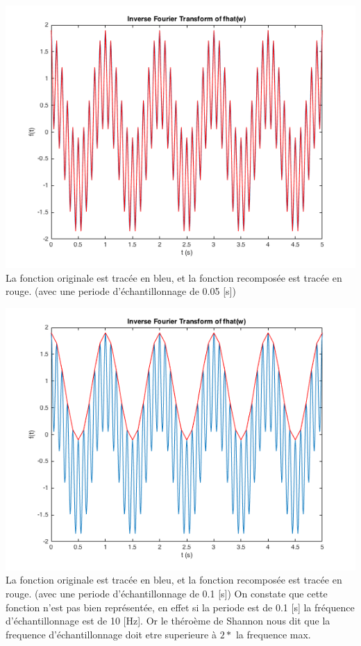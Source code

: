\documentclass[a4paper,11pt]{article}
\begin{document}
\begin{center}
\includegraphics[scale=0.6]{"f_and_f_ifft1.png"} \newline
La fonction originale est tracée en bleu, et la fonction recomposée est tracée en rouge. (avec une periode d'échantillonnage de 0.05 [s]) 
\end{center} 

\begin{center}
\includegraphics[scale=0.6]{"f_and_f_ifft2.png"} \newline
La fonction originale est tracée en bleu, et la fonction recomposée est tracée en rouge. (avec une periode d'échantillonnage de 0.1 [s])  On constate que cette fonction n'est pas bien représentée, en effet si la periode est de 0.1 [s] la fréquence d'échantillonnage est de 10 [Hz]. Or le théroème de Shannon nous dit que la frequence d'échantillonnage doit etre superieure à $2 *$ la frequence max.
\end{center} 
\end{document}

